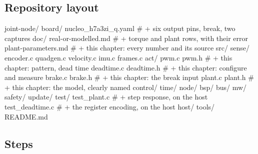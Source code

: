 \subsection*{Repository layout}

\begin{plaincode}
joint-node/
  board/  nucleo_h7a3zi_q.yaml         # + six output pins, break, two captures
  doc/
    real-or-modelled.md                # + torque and plant rows, with their error
    plant-parameters.md                # + this chapter: every number and its source
  src/
    sense/   encoder.c quadgen.c velocity.c imu.c frames.c
    act/
      pwm.c      pwm.h                 # + this chapter: pattern, dead time
      deadtime.c deadtime.h            # + this chapter: configure and measure
      brake.c    brake.h               # + this chapter: the break input
      plant.c    plant.h               # + this chapter: the model, clearly named
    control/ time/ node/ bsp/
    bus/  mw/  safety/  update/
  test/
    test_plant.c                       # + step response, on the host
    test_deadtime.c                    # + the register encoding, on the host
  host/  tools/  README.md
\end{plaincode}

\subsection*{Steps}

